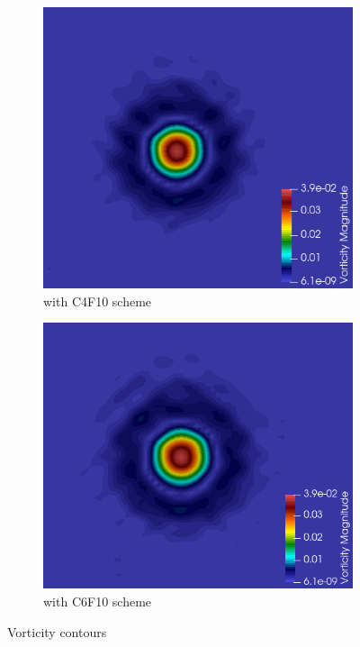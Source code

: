 \documentclass{hcmut-report}
\begin{document}
\begin{figure}[H]
     \begin{subfigure}[b]{0.35\textwidth}
         \centering
         \includegraphics[width=\textwidth]{graphics/vorticityC4.png}
         \caption{with C4F10 scheme}
         \label{fig:3.1}
     \end{subfigure}
     \hspace{0.5cm}
     \begin{subfigure}[b]{0.35\textwidth}
         \centering
         \includegraphics[width=\textwidth]{graphics/vorticityC6.png}
         \caption{with C6F10 scheme}
         \label{fig:3.1}
     \end{subfigure}
     \caption{Vorticity contours}
     \label{fig:3}
    \end{figure}
\end{document}

